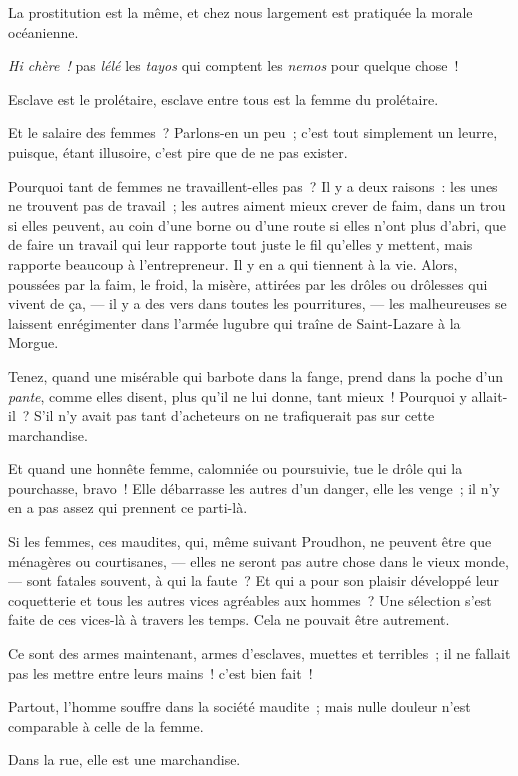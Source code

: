 \documentclass[french,twoside]{book} %
\begin{document}
La prostitution est la même, et chez nous largement est pratiquée la morale océanienne.\par
\emph{Hi chère !} pas \emph{lélé} les \emph{tayos} qui comptent les \emph{nemos} pour quelque chose !\par
Esclave est le prolétaire, esclave entre tous est la femme du prolétaire.\par
Et le salaire des femmes ? Parlons-en un peu ; c’est tout simplement un leurre, puisque, étant illusoire, c’est pire que de ne pas exister.\par
Pourquoi tant de femmes ne travaillent-elles pas ? Il y a deux raisons : les unes ne trouvent pas de travail ; les autres aiment mieux crever de faim, dans un trou si elles peuvent, au coin d’une borne ou d’une route si elles n’ont plus d’abri, que de faire un travail qui leur rapporte tout  juste le fil qu’elles y mettent, mais rapporte beaucoup à l’entrepreneur. Il y en a qui tiennent à la vie. Alors, poussées par la faim, le froid, la misère, attirées par les drôles ou drôlesses qui vivent de ça, — il y a des vers dans toutes les pourritures, — les malheureuses se laissent enrégimenter dans l’armée lugubre qui traîne de Saint-Lazare à la Morgue.\par
Tenez, quand une misérable qui barbote dans la fange, prend dans la poche d’un \emph{pante}, comme elles disent, plus qu’il ne lui donne, tant mieux ! Pourquoi y allait-il ? S’il n’y avait pas tant d’acheteurs on ne trafiquerait pas sur cette marchandise.\par
Et quand une honnête femme, calomniée ou poursuivie, tue le drôle qui la pourchasse, bravo ! Elle débarrasse les autres d’un danger, elle les venge ; il n’y en a pas assez qui prennent ce parti-là.\par
Si les femmes, ces maudites, qui, même suivant Proudhon, ne peuvent être que ménagères ou courtisanes, — elles ne seront pas autre chose dans le vieux monde, — sont fatales souvent, à qui la faute ? Et qui a pour son plaisir développé leur coquetterie et tous les autres vices agréables aux hommes ? Une sélection s’est faite de ces vices-là à travers les temps. Cela ne pouvait être autrement.\par
 Ce sont des armes maintenant, armes d’esclaves, muettes et terribles ; il ne fallait pas les mettre entre leurs mains ! c’est bien fait !\par
Partout, l’homme souffre dans la société maudite ; mais nulle douleur n’est comparable à celle de la femme.\par
Dans la rue, elle est une marchandise.\par
\end{document}

